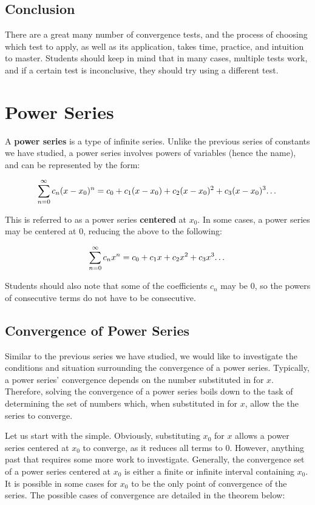 \documentclass[11pt]{article}
\begin{document}

\subsection{Conclusion}
There are a great many number of convergence tests, and the process of choosing which test to apply, as well as its application, takes time, practice, and intuition to master. Students should keep in mind that in many cases, multiple tests work, and if a certain test is inconclusive, they should try using a different test.

\section{Power Series}
A \textbf{power series} is a type of infinite series. Unlike the previous series of constants we have studied, a power series involves powers of variables (hence the name), and can be represented by the form:

\[\sum_{n=0}^{\infty} c_n(x-x_0)^n = c_0 + c_1(x-x_0) + c_2(x-x_0)^2 + c_3(x-x_0)^3 \text{\dots}\]

This is referred to as a power series \textbf{centered} at $x_0$. In some cases, a power series may be centered at $0$, reducing the above to the following:

\[\sum_{n=0}^{\infty} c_nx^n = c_0 + c_1x + c_2x^2 + c_3x^3 \text{\dots}\]

Students should also note that some of the coefficients $c_n$ may be $0$, so the powers of consecutive terms do not have to be consecutive. 




\subsection{Convergence of Power Series}
Similar to the previous series we have studied, we would like to investigate the conditions and situation surrounding the convergence of a power series. Typically, a power series' convergence depends on the number substituted in for $x$. Therefore, solving the convergence of a power series boils down to the task of determining the set of numbers which, when substituted in for $x$, allow the the series to converge.

Let us start with the simple. Obviously, substituting $x_0$ for $x$ allows a power series centered at $x_0$ to converge, as it reduces all terms to $0$. However, anything past that requires some more work to investigate. Generally, the convergence set of a power series centered at $x_0$ is either a finite or infinite interval containing $x_0$. It is possible in some cases for $x_0$ to be the only point of convergence of the series. The possible cases of convergence are detailed in the theorem below:\\
\end{document}
